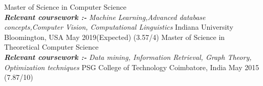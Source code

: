 \begin{cventries}
\cventry
    {Master of Science in Computer Science
    \\
    \textbf{\textit{Relevant coursework :-}} \textit{Machine Learning,Advanced database concepts,Computer Vision, Computational Linguistics}}
    {Indiana University}
    {Bloomington, USA}
    {May 2019(Expected)}
    {(3.57/4)}
    {}
  \cventry
    {Master of Science in Theoretical Computer Science
    \\
    \textbf{\textit{Relevant coursework :-}} \textit{Data mining, Information Retrieval, Graph Theory, Optimization techniques}}
    {PSG College of Technology}
    {Coimbatore, India}
    {May 2015}
    {(7.87/10)}

\end{cventries}
% 
